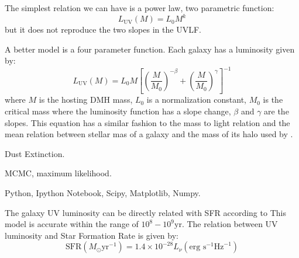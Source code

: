 The simplest relation we can have is a power law, two parametric function:
 \begin{equation}
    L_{\textrm{UV}} (M) = L_0 M^k
 \end{equation}
but it does not reproduce the two slopes in the UVLF.

A better model is a four parameter function. Each galaxy has a luminosity given
by:
  \begin{equation}
  L_{\textrm{UV}} (M) = L_{0} M \left[ \left( \frac{M}{M_0}\right)^{-\beta} 
		   + \left( \frac{M}{M_0}\right)^{\gamma} 
               \right]^{-1}
  \end{equation}
where $M$ is the hosting DMH mass, $L_{0}$ is a normalization constant, $M_0$
is the critical mass where the luminosity function has a slope change, 
$\beta$ and $\gamma$ are the slopes. This equation has a similar fashion to the
mass to light relation \citep{vandenbosch03} and the mean relation between
stellar mas of a galaxy and the mass of its halo used by \citet{moster10}.


Dust Extinction.


MCMC, maximum likelihood.

Python, Ipython Notebook, Scipy, Matplotlib, Numpy.

The galaxy UV luminosity can be directly related with SFR according to \citet{madau98}
This model is accurate within the range of $10^8 - 10^9 \textrm{yr}$\citep{kennicutt98}.
The relation between UV luminosity and Star Formation Rate \citep{madau98,kennicutt98} 
is given by:
\begin{equation}
 \textrm{SFR}\left(M_\odot \textrm{yr}^{-1}\right) 
      = 1.4 \times 10^{-28} L_{\nu} \left( \textrm{erg s}^{-1}\textrm{Hz}^{-1} 
	\right)
\end{equation}
